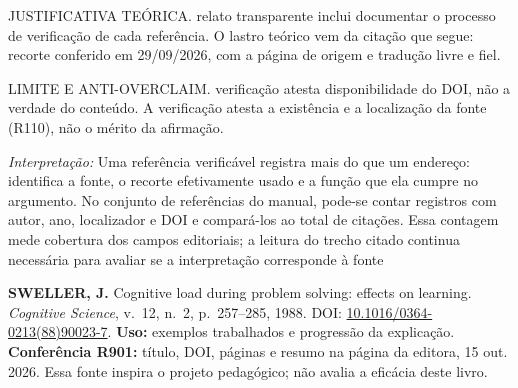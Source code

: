 \begin{descricao}
JUSTIFICATIVA TEÓRICA. relato transparente inclui documentar o processo de verificação de cada referência. O lastro teórico vem da citação que segue: recorte conferido em 29/09/2026, com a página de origem e tradução livre e fiel.
\end{descricao}

\begin{aviso}
LIMITE E ANTI-OVERCLAIM. verificação atesta disponibilidade do DOI, não a verdade do conteúdo. A verificação atesta a existência e a
localização da fonte (R110), não o mérito da afirmação.
\end{aviso}

\noindent\textit{Interpretação:} Uma referência verificável registra mais do que um endereço: identifica a fonte, o recorte efetivamente usado e a função que ela cumpre no argumento. No conjunto de referências do manual, pode-se contar registros com autor, ano, localizador e DOI e compará-los ao total de citações. Essa contagem mede cobertura dos campos editoriais; a leitura do trecho citado continua necessária para avaliar se a interpretação corresponde à fonte %

\begin{referencia}
\textbf{SWELLER, J.} Cognitive load during problem solving: effects on learning.
\emph{Cognitive Science}, v.~12, n.~2, p.~257--285, 1988.
DOI: \href{https://doi.org/10.1016/0364-0213(88)90023-7}{10.1016/0364-0213(88)90023-7}.
\textbf{Uso:} exemplos trabalhados e progressão da explicação.
\textbf{Conferência R901:} título, DOI, páginas e resumo na página da editora,
15 out. 2026. Essa fonte inspira o projeto pedagógico; não avalia a eficácia deste livro.
\end{referencia}

